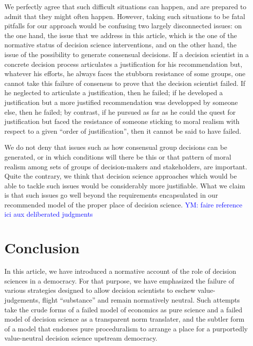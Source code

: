 \documentclass[preprint, french, english, 11pt]{elsarticle}%
\newcommand{\commentYM}[1]{\textcolor{blue}{YM: #1}}
\begin{document}
We perfectly agree that such difficult situations can happen, and are prepared to admit that they might often happen. However, taking such situations to be fatal pitfalls for our approach would be confusing two largely disconnected issues: on the one hand, the issue that we address in this article, which is the one of the normative status of decision science interventions, and on the other hand, the issue of the possibility to generate consensual decisions. If a decision scientist in a concrete decision process articulates a justification for his recommendation but, whatever his efforts, he always faces the stubborn resistance of some groups, one cannot take this failure of consensus to prove that the decision scientist failed. If he neglected to articulate a justification, then he failed; if he developed a justification but a more justified recommendation was developped by someone else, then he failed; by contrast, if he pursued as far as he could the quest for justification but faced the resistance of someone sticking to moral realism with respect to a given ``order of justification'', then it cannot be said to have failed.

We do not deny that issues such as how consensual group decisions can be generated, or in which conditions will there be this or that pattern of moral realism among sets of groups of decision-makers and stakeholders, are important. Quite the contrary, we think that decision science approaches which would be able to tackle such issues would be considerably more justifiable. What we claim is that such issues go well beyond the requirements encapsulated in our recommended model of the proper place of decision science.
\commentYM{faire reference ici aux deliberated judgments}

\section{Conclusion}
In this article, we have introduced a normative account of the role of decision sciences in a democracy. For that purpose, we have emphasized the failure of various strategies designed to allow decision scientists to eschew value-judgements, flight ``substance'' and remain normatively neutral. Such attempts take the crude forms of a failed model of economics as pure science and a failed model of decision science as a transparent norm translater, and the subtler form of a model that endorses pure proceduralism to arrange a place for a purportedly value-neutral decision science upstream democracy.
\end{document}
